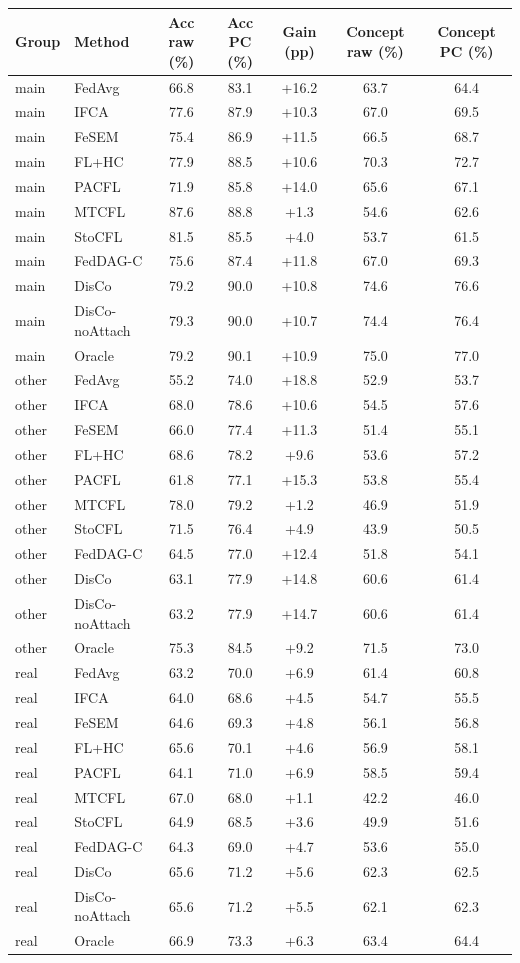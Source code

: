 {\scriptsize
\begin{tabular}{l l c c c c c}
\toprule
Group & Method & Acc raw (\%) & Acc PC (\%) & Gain (pp) & Concept raw (\%) & Concept PC (\%) \\
\midrule
main & FedAvg & 66.8 & 83.1 & +16.2 & 63.7 & 64.4 \\
main & IFCA & 77.6 & 87.9 & +10.3 & 67.0 & 69.5 \\
main & FeSEM & 75.4 & 86.9 & +11.5 & 66.5 & 68.7 \\
main & FL+HC & 77.9 & 88.5 & +10.6 & 70.3 & 72.7 \\
main & PACFL & 71.9 & 85.8 & +14.0 & 65.6 & 67.1 \\
main & MTCFL & 87.6 & 88.8 & +1.3 & 54.6 & 62.6 \\
main & StoCFL & 81.5 & 85.5 & +4.0 & 53.7 & 61.5 \\
main & FedDAG-C & 75.6 & 87.4 & +11.8 & 67.0 & 69.3 \\
main & DisCo & 79.2 & 90.0 & +10.8 & 74.6 & 76.6 \\
main & DisCo-noAttach & 79.3 & 90.0 & +10.7 & 74.4 & 76.4 \\
main & Oracle & 79.2 & 90.1 & +10.9 & 75.0 & 77.0 \\
other & FedAvg & 55.2 & 74.0 & +18.8 & 52.9 & 53.7 \\
other & IFCA & 68.0 & 78.6 & +10.6 & 54.5 & 57.6 \\
other & FeSEM & 66.0 & 77.4 & +11.3 & 51.4 & 55.1 \\
other & FL+HC & 68.6 & 78.2 & +9.6 & 53.6 & 57.2 \\
other & PACFL & 61.8 & 77.1 & +15.3 & 53.8 & 55.4 \\
other & MTCFL & 78.0 & 79.2 & +1.2 & 46.9 & 51.9 \\
other & StoCFL & 71.5 & 76.4 & +4.9 & 43.9 & 50.5 \\
other & FedDAG-C & 64.5 & 77.0 & +12.4 & 51.8 & 54.1 \\
other & DisCo & 63.1 & 77.9 & +14.8 & 60.6 & 61.4 \\
other & DisCo-noAttach & 63.2 & 77.9 & +14.7 & 60.6 & 61.4 \\
other & Oracle & 75.3 & 84.5 & +9.2 & 71.5 & 73.0 \\
real & FedAvg & 63.2 & 70.0 & +6.9 & 61.4 & 60.8 \\
real & IFCA & 64.0 & 68.6 & +4.5 & 54.7 & 55.5 \\
real & FeSEM & 64.6 & 69.3 & +4.8 & 56.1 & 56.8 \\
real & FL+HC & 65.6 & 70.1 & +4.6 & 56.9 & 58.1 \\
real & PACFL & 64.1 & 71.0 & +6.9 & 58.5 & 59.4 \\
real & MTCFL & 67.0 & 68.0 & +1.1 & 42.2 & 46.0 \\
real & StoCFL & 64.9 & 68.5 & +3.6 & 49.9 & 51.6 \\
real & FedDAG-C & 64.3 & 69.0 & +4.7 & 53.6 & 55.0 \\
real & DisCo & 65.6 & 71.2 & +5.6 & 62.3 & 62.5 \\
real & DisCo-noAttach & 65.6 & 71.2 & +5.5 & 62.1 & 62.3 \\
real & Oracle & 66.9 & 73.3 & +6.3 & 63.4 & 64.4 \\
\bottomrule
\end{tabular}
}
